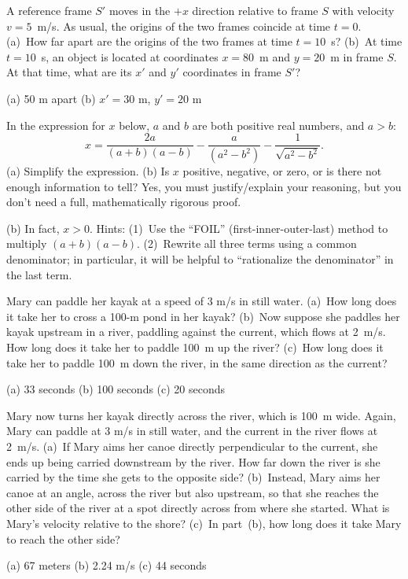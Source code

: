 \begin{Exercise}[difficulty=1]
A reference frame $S'$ moves in the $+x$ direction relative to frame $S$ with velocity $v=5$~m/s.  As usual, the origins of the two frames coincide at time $t=0$.  (a)~How far apart are the origins of the two frames at time $t=10$~s?  (b)~At time $t=10$~s, an object is located at coordinates $x=80$~m and $y=20$~m in frame $S$.  At that time, what are its $x'$ and $y'$ coordinates in frame $S'$?
\end{Exercise}
\begin{Answer}
(a) 50 m apart (b) $x'=30$ m, $y'=20$ m
\end{Answer}



\begin{Exercise}[difficulty=1]
In the expression for $x$ below, $a$ and $b$ are both positive real numbers, and $a>b$:  
$$
x=\frac{2a}{(a+b)(a-b)} -\frac{a}{(a^2-b^2 )}-\frac{1}{\sqrt{a^2-b^2}} .
$$(a) Simplify the expression. 
(b) Is $x$ positive, negative, or zero, or is there not enough information to tell?  Yes, you must justify/explain your reasoning, but you don't need a full, mathematically rigorous proof.
\end{Exercise}
\begin{Answer}
(b) In fact, $x>0$. Hints: (1)~Use the ``FOIL'' (first-inner-outer-last) method to multiply $(a+b)(a-b)$. (2)~Rewrite all three terms using a common denominator; in particular, it will be helpful to ``rationalize the denominator'' in the last term.
\end{Answer}

\begin{Exercise}
Mary can paddle her kayak at a speed of 3 m/s in still water.  (a)~How long does it take her to cross a 100-m pond in her kayak?  (b)~Now suppose she paddles her kayak upstream in a river, paddling against the current, which flows at 2~m/s.  How long does it take her to paddle 100~m up the river?  (c)~How long does it take her to paddle 100~m down the river, in the same direction as the current?
\end{Exercise}
\begin{Answer}
(a) 33 seconds (b) 100 seconds (c) 20 seconds
\end{Answer}

\begin{Exercise}
Mary now turns her kayak directly across the river, which is 100~m wide.  Again, Mary can paddle at 3 m/s in still water, and the current in the river flows at 2~m/s.  
(a)~If Mary aims her canoe directly perpendicular to the current, she ends up being carried downstream by the river.  How far down the river is she carried by the time she gets to the opposite side?  
(b)~Instead, Mary aims her canoe at an angle, across the river but also upstream, so that she reaches the other side of the river at a spot directly across from where she started.  What is Mary's velocity relative to the shore?  
(c)~In part~(b), how long does it take Mary to reach the other side?
\end{Exercise}
\begin{Answer}
(a) 67 meters (b) 2.24 m/s (c) 44 seconds
\end{Answer}

